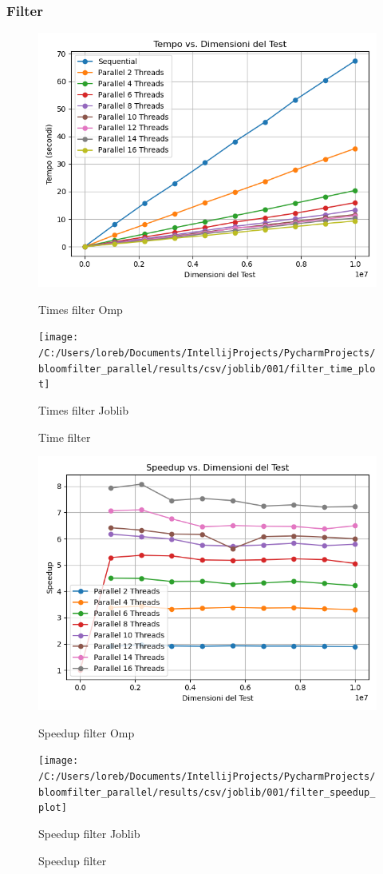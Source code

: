 \documentclass[11pt]{article}
\begin{document}
    \subsubsection{Filter}\label{subsubsec:filter}
    \begin{figure}[H]
        \centering
        \includegraphics[width=\linewidth]{omp/001/filter_time_plot}
            \caption{Times filter Omp}\label{fig:filter_time_omp}
        \endminipage\hfill
        \texttt{[image: /C:/Users/loreb/Documents/IntellijProjects/PycharmProjects/bloomfilter\_parallel/results/csv/joblib/001/filter\_time\_plot]}
            \caption{Times filter Joblib}\label{fig:filter_time_joblib}
        \endminipage\hfill
        \caption{Time filter}
    \end{figure}
    \begin{figure}[H]
        \centering
        \includegraphics[width=\linewidth]{omp/001/filter_speedup_plot}
            \caption{Speedup filter Omp}\label{fig:filter_speedup_omp}
        \endminipage\hfill
        \texttt{[image: /C:/Users/loreb/Documents/IntellijProjects/PycharmProjects/bloomfilter\_parallel/results/csv/joblib/001/filter\_speedup\_plot]}
            \caption{Speedup filter Joblib}\label{fig:filter_speedup_joblib}
        \endminipage\hfill
        \caption{Speedup filter}
    \end{figure}
\end{document}
